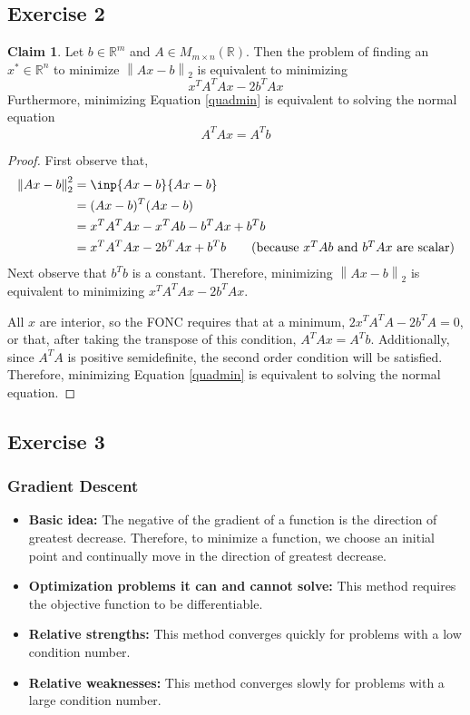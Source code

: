 \documentclass[letterpaper,12pt]{article}
\theoremstyle{definition}
\newtheorem{claim}[theorem]{Claim}
\newcommand{\norm}[1]{\left\lVert#1\right\rVert}
\begin{document}
\subsection*{Exercise 2}
\begin{claim}
Let $b \in \mathbb{R}^m$ and $A \in M_{m \times n}(\mathbb{R})$. Then the problem of finding an $x^* \in \mathbb{R}^n$ to minimize $\norm{Ax-b}_2$ is equivalent to minimizing
\begin{equation}\label{quadmin}
x^TA^TAx - 2b^TAx
\end{equation}
Furthermore, minimizing Equation \ref{quadmin} is equivalent to solving the normal equation
\begin{equation}
A^TAx = A^Tb
\end{equation} 
\end{claim}
\begin{proof}
First observe that,
\begin{align*}
\norm{Ax-b}^2_2 &= \inp{Ax-b}{Ax-b} \\
&= (Ax - b)^T(Ax-b) \\
&= x^TA^TAx - x^TAb - b^TAx + b^Tb \\
&=  x^TA^TAx  - 2 b^TAx + b^Tb \tag{because $ x^TAb$ and $b^TAx$ are scalar}
\end{align*}
Next observe that $b^Tb$ is a constant. Therefore, minimizing $\norm{Ax-b}_2$ is equivalent to minimizing $x^TA^TAx  - 2 b^TAx$.   

All $x$ are interior, so the FONC requires that at a minimum, $2x^TA^TA - 2b^TA = 0$, or that, after taking the transpose of this condition, $A^TAx = A^Tb$. Additionally, since $A^TA$ is positive semidefinite, the second order condition will be satisfied. Therefore, minimizing Equation \ref{quadmin} is equivalent to solving the normal equation. 
\end{proof}

\subsection*{Exercise 3}
\subsubsection*{Gradient Descent}
\begin{itemize}
\item \textbf{Basic idea:} The negative of the gradient of a function is the direction of greatest decrease. Therefore, to minimize a function, we choose an initial point and continually move in the direction of greatest decrease.  
\item \textbf{Optimization problems it can and cannot solve:} This method requires the objective function to be differentiable. 
\item \textbf{Relative strengths:} This method converges quickly for problems with a low condition number.
\item \textbf{Relative weaknesses:} This method converges slowly for problems with a large condition number.
\end{itemize}
\end{document}
